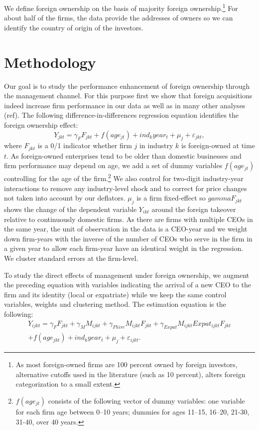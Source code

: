\documentclass[12pt,a4paper]{article}
\begin{document}
We define foreign ownership on the basis of majority foreign ownership.\footnote{As most foreign-owned firms are 100 percent owned by foreign investors, alternative cutoffs used in the literature (such as 10 percent), alters foreign categorization to a small extent.} For about half of the firms, the data provide the addresses of owners so we can identify the country of origin of the investors.

\section{Methodology}
Our goal is to study the performance enhancement of foreign ownership through the management channel. For this purpose first we show that foreign acquisitions indeed increase firm performance in our data as well as in many other analyses (ref). The following difference-in-differences regression equation identifies the foreign ownership effect:
\begin{equation}
	Y_{jkt} = \gamma_F F_{jkt} + f(age_{jt}) + ind_{k}year_{t}+\mu_j+\varepsilon_{jkt},
\end{equation}
where $F_{jkt}$ is a 0/1 indicator whether firm $j$ in industry $k$ is foreign-owned at time $t$. As foreign-owned enterprises tend to be older than domestic businesses and firm performance may depend on age, we add a set of dummy variables $f(age_{jt})$ controlling for the age of the firm.\footnote{$f(age_{jt})$ consists of the following vector of dummy variables: one variable for each firm age between 0--10 years; dummies for ages 11--15, 16--20, 21-30, 31-40, over 40 years.} We also control for two-digit industry-year interactions to remove any industry-level shock and to correct for price changes not taken into account by our deflators. $\mu_j$ is a firm fixed-effect so $gamma{F_{jkt}}$ shows the change of the dependent variable $Y_{ikt}$ around the foreign takeover relative to continuously domestic firms. As there are firms with multiple CEOs in the same year, the unit of observation in the data is a CEO-year and we weight down firm-years with the inverse of the number of CEOs who serve in the firm in a given year to allow each firm-year have an identical weight in the regression. We cluster standard errors at the firm-level.

To study the direct effects of management under foreign ownership, we augment the preceding equation with variables indicating the arrival of a new CEO to the firm and its identity (local or expatriate) while we keep the same control variables, weights and clustering method. The estimation equation is the following:
\begin{equation}
\begin{split}
	Y_{ijkt} = \gamma_F F_{jkt} + \gamma_M M_{ijkt} + \gamma_{Fhire} M_{ijkt} F_{jkt} + \gamma_{Expat}  M_{ijkt} Expat_{ijkt} F_{jkt} \\
	+ f(age_{jkt}) + ind_{k}year_{t} + \mu_j+\varepsilon_{ijkt}.
\end{split}
\end{equation}
\end{document}
